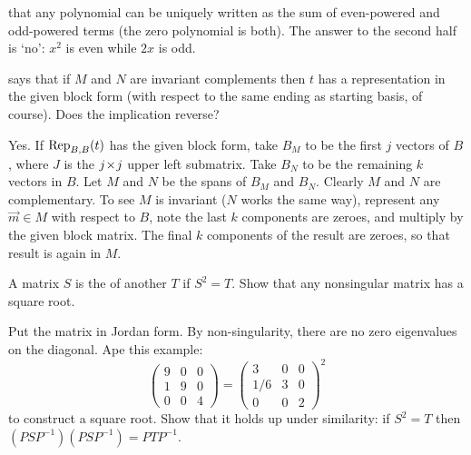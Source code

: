 \begin{exercises}
\begin{answer}
      that any polynomial can be uniquely
       written as the sum of even-powered and odd-powered terms (the
       zero polynomial is both).
       The answer to the second half is `no': \( x^2 \) is even while
       \( 2x \) is odd.  
     \end{answer}
  \item 
     says that if \( M \) and
    \( N \) are
    invariant complements then \( t \) has a representation in the given
    block form (with respect to the same ending as starting basis, of course).
    Does the implication reverse?
    \begin{answer}
      Yes.
      If \( \rep{t}{B,B} \) has the given block form, take \( B_M \) to
      be the first \( j \) vectors of \( B \), where \( J \) is the
      \( \nbyn{j} \) upper left submatrix.
      Take \( B_N \) to be the remaining \( k \) vectors in \( B \).
      Let \( M \) and \( N \) be the spans of \( B_M \) and \( B_N \).
      Clearly \( M \) and \( N \) are complementary.
      To see \( M \) is invariant (\( N \) works the same way), represent
      any \( \vec{m}\in M \) with respect to \( B \), note the last
      \( k \) components are zeroes, and multiply by the given block
      matrix.
      The final \( k \) components of the result are zeroes, so that
      result is again in \( M \). 
     \end{answer}
   \item 
     A matrix \( S \) is the 
     of another \( T \) if \( S^2=T \).
     Show that any nonsingular matrix has a square root.
     \begin{answer}
         Put the matrix in Jordan form.
         By non-singularity, there are no zero eigenvalues on the diagonal.
         Ape this example:
          \begin{equation*}
             \begin{pmatrix}
                9  &0  &0 \\
                1  &9  &0 \\
                0  &0  &4
             \end{pmatrix}
             =
             \begin{pmatrix}
                3  &0  &0 \\
               1/6 &3  &0 \\
                0  &0  &2
             \end{pmatrix}^2
          \end{equation*}
         to construct a square root.
         Show that it holds up under similarity: if \( S^2=T \) then
         \( (PSP^{-1})(PSP^{-1})=PTP^{-1} \). 
    \end{answer}
\end{exercises}
